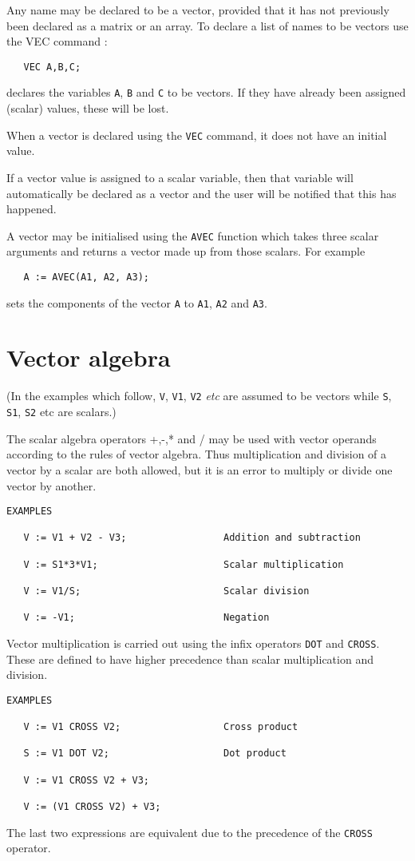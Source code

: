Any name may be declared to be a vector, provided that it has
not previously been declared as a matrix or an array. To
declare a list of names to be vectors use the VEC command :
\begin{verbatim}
   VEC A,B,C;
\end{verbatim}
declares the variables {\tt A}, {\tt B} and {\tt C} to be vectors. 
If they have already been assigned (scalar) values, these will be lost.

When a vector is declared using the {\tt VEC} command, it does not
have an initial value.

If a vector value is assigned to a scalar variable, then that
variable will automatically be declared as a vector and the
user will be notified that this has happened.

A vector may be initialised using the {\tt AVEC} function which
takes three scalar arguments and returns a vector made up
from those scalars. For example
\begin{verbatim}
   A := AVEC(A1, A2, A3);
\end{verbatim}
sets the components of the vector {\tt A} to {\tt A1}, {\tt A2} and {\tt A3}.

\section{Vector algebra}

(In the examples which follow, {\tt V}, {\tt V1}, {\tt V2} {\em etc}
are assumed to be vectors while {\tt S}, {\tt S1}, {\tt S2} etc are scalars.)

The scalar algebra operators +,-,* and / may be used with
vector operands according to the rules of vector algebra.
Thus multiplication and division of a vector by a scalar
are both allowed, but it is an error to multiply or
divide one vector by another.
\begin{verbatim}
EXAMPLES

   V := V1 + V2 - V3;                 Addition and subtraction

   V := S1*3*V1;                      Scalar multiplication

   V := V1/S;                         Scalar division

   V := -V1;                          Negation
\end{verbatim}

\noindent Vector multiplication is carried out using the infix
operators {\tt DOT} and {\tt CROSS}. These are defined to have
higher precedence than scalar multiplication and
division.
\begin{verbatim}
EXAMPLES

   V := V1 CROSS V2;                  Cross product

   S := V1 DOT V2;                    Dot product

   V := V1 CROSS V2 + V3;

   V := (V1 CROSS V2) + V3;
\end{verbatim}
The last two expressions are equivalent due to the precedence of
the {\tt CROSS} operator.


